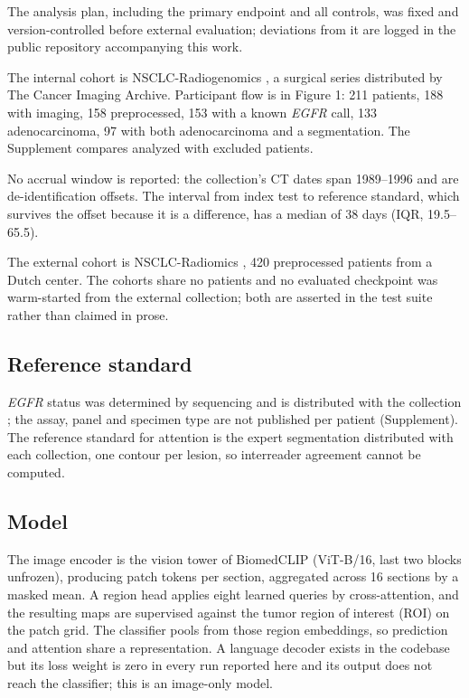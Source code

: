 \documentclass[11pt]{article}
\begin{document}
The analysis plan, including the primary endpoint and all controls, was fixed and
version-controlled before external evaluation; deviations from it are logged in
the public repository accompanying this work.

The internal cohort is NSCLC-Radiogenomics \citep{bakr2018}, a surgical series
distributed by The Cancer Imaging Archive. Participant flow is in Figure 1: 211
patients, 188 with imaging, 158 preprocessed, 153 with a known \textit{EGFR} call,
133 adenocarcinoma, 97 with both adenocarcinoma and a segmentation. The Supplement
compares analyzed with excluded patients.

No accrual window is reported: the collection's CT dates span 1989--1996 and are
de-identification offsets. The interval from index test to reference standard,
which survives the offset because it is a difference, has a median of 38 days
(IQR, 19.5--65.5).

The external cohort is NSCLC-Radiomics \citep{aerts2014}, 420 preprocessed
patients from a Dutch center. The cohorts share no patients and no evaluated
checkpoint was warm-started from the external collection; both are asserted in the
test suite rather than claimed in prose.

\subsection*{Reference standard}

\textit{EGFR} status was determined by sequencing and is distributed with the
collection \citep{bakr2018}; the assay, panel and specimen type are not published
per patient (Supplement). The reference standard for attention is the expert
segmentation distributed with each collection, one contour per lesion, so
interreader agreement cannot be computed.

\subsection*{Model}

The image encoder is the vision tower of BiomedCLIP \citep{biomedclip}
(ViT-B/16, last two blocks unfrozen), producing patch tokens per section, aggregated across 16 sections by a
masked mean. A region head applies eight learned queries by cross-attention, and
the resulting maps are supervised against the tumor region of interest (ROI) on
the patch grid. The classifier pools from those region embeddings, so prediction
and attention share a representation. A language decoder exists in the codebase
but its loss weight is zero in every run reported here and its output does not
reach the classifier; this is an image-only model.
\end{document}
